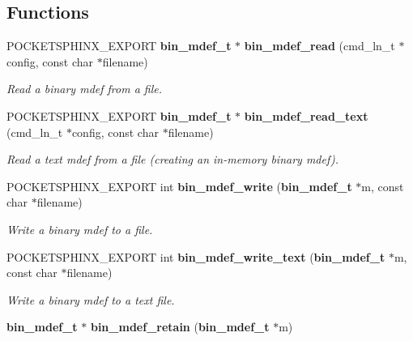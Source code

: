 \subsection*{Functions}
\begin{DoxyCompactItemize}
\item 
P\+O\+C\+K\+E\+T\+S\+P\+H\+I\+N\+X\+\_\+\+E\+X\+P\+O\+R\+T {\bf bin\+\_\+mdef\+\_\+t} $\ast$ {\bf bin\+\_\+mdef\+\_\+read} (cmd\+\_\+ln\+\_\+t $\ast$config, const char $\ast$filename)\label{bin__mdef_8h_a3930ae6b3309a615335585db4b46306f}

\begin{DoxyCompactList}\small\item\em Read a binary mdef from a file. \end{DoxyCompactList}\item 
P\+O\+C\+K\+E\+T\+S\+P\+H\+I\+N\+X\+\_\+\+E\+X\+P\+O\+R\+T {\bf bin\+\_\+mdef\+\_\+t} $\ast$ {\bf bin\+\_\+mdef\+\_\+read\+\_\+text} (cmd\+\_\+ln\+\_\+t $\ast$config, const char $\ast$filename)\label{bin__mdef_8h_a00dab94d45d1adc5f7778fd1e2398031}

\begin{DoxyCompactList}\small\item\em Read a text mdef from a file (creating an in-\/memory binary mdef). \end{DoxyCompactList}\item 
P\+O\+C\+K\+E\+T\+S\+P\+H\+I\+N\+X\+\_\+\+E\+X\+P\+O\+R\+T int {\bf bin\+\_\+mdef\+\_\+write} ({\bf bin\+\_\+mdef\+\_\+t} $\ast$m, const char $\ast$filename)\label{bin__mdef_8h_a982b8e598afed47805fab1509e8fc4bb}

\begin{DoxyCompactList}\small\item\em Write a binary mdef to a file. \end{DoxyCompactList}\item 
P\+O\+C\+K\+E\+T\+S\+P\+H\+I\+N\+X\+\_\+\+E\+X\+P\+O\+R\+T int {\bf bin\+\_\+mdef\+\_\+write\+\_\+text} ({\bf bin\+\_\+mdef\+\_\+t} $\ast$m, const char $\ast$filename)\label{bin__mdef_8h_af89d79226df33947019efcfe7377d586}

\begin{DoxyCompactList}\small\item\em Write a binary mdef to a text file. \end{DoxyCompactList}\item 
{\bf bin\+\_\+mdef\+\_\+t} $\ast$ {\bf bin\+\_\+mdef\+\_\+retain} ({\bf bin\+\_\+mdef\+\_\+t} $\ast$m)\label{bin__mdef_8h_a297167f03662a9cbd650743d3f4cf8f8}


\end{DoxyCompactItemize}
